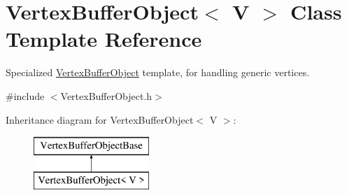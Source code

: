 \hypertarget{class_vertex_buffer_object}{}\section{Vertex\+Buffer\+Object$<$ V $>$ Class Template Reference}
\label{class_vertex_buffer_object}


Specialized \hyperlink{class_vertex_buffer_object}{Vertex\+Buffer\+Object} template, for handling generic vertices.  




{\ttfamily \#include $<$Vertex\+Buffer\+Object.\+h$>$}

Inheritance diagram for Vertex\+Buffer\+Object$<$ V $>$\+:\begin{figure}[H]
\begin{center}
\leavevmode
\includegraphics[height=2.000000cm]{class_vertex_buffer_object}
\end{center}
\end{figure}
